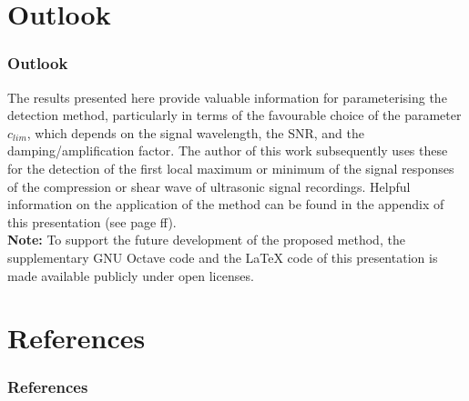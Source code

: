 \documentclass[11pt,aspectratio=169]{beamer}
\begin{document}
	\section{Outlook}
	\begin{frame}
		\frametitle{Outlook}
		The results presented here provide valuable information for parameterising the detection method, particularly in terms of the favourable choice of the parameter $c_{lim}$, which depends on the signal wavelength, the SNR, and the damping/amplification factor. The author of this work subsequently uses these for the detection of the first local maximum or minimum of the signal responses of the compression or shear wave of ultrasonic signal recordings\cite{webpaper2,webpaper3}.
		Helpful information on the application of the method can be found in the appendix of this presentation (see page \pageref{sec:appendix}ff).\\
		\vspace*{.5em}
		\textbf{Note:} To support the future development of the proposed method, the supplementary GNU Octave code\autocite{progcode} and the \LaTeX{} code\autocite{texcode} of this presentation is made available publicly under open licenses.
	\end{frame}
	\section*{References}
	\begin{frame}[noframenumbering,shrink=12]
		\frametitle{References}
		\printbibliography
	\end{frame}
	\appendix
\end{document}

